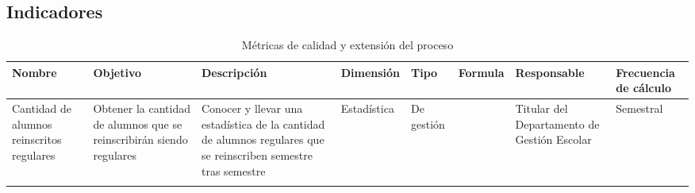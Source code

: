 
\newpage
\subsection{Indicadores}
\begin{longtable}{|p{1.3cm}|p{1.4cm}|p{2cm}|p{2cm}|p{.8cm}|p{1.3cm}|p{2.2cm}|p{2cm}|}%
		\hline
			\footnotesize\textbf{Nombre} & 
			\footnotesize\textbf{Objetivo} & 
			\footnotesize\textbf{Descripción} & 
			\footnotesize\textbf{Dimensión} & 
			\footnotesize\textbf{Tipo} & 
			\footnotesize\textbf{Formula} & 
			\footnotesize\textbf{Responsable} & 
			\footnotesize\textbf{Frecuencia de cálculo}\\
		\hline\hline%
			\footnotesize{Cantidad de alumnos reinscritos regulares} & 
			\footnotesize{Obtener la cantidad de alumnos que se reinscribirán siendo regulares} & 
			\footnotesize{Conocer y llevar una estadística de la cantidad de alumnos regulares que se reinscriben semestre tras semestre} & 
			\footnotesize{Estadística} & 
			\footnotesize{De gestión} & 
			\footnotesize{%
			} & 
			\footnotesize{Titular del Departamento de Gestión Escolar} & 
			\footnotesize{Semestral}\\
		\hline
\caption{Métricas de calidad y extensión del proceso}
\end{longtable}

